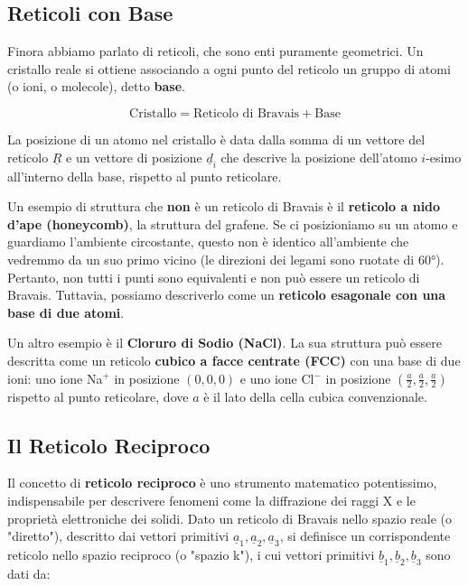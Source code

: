 \subsection{Reticoli con Base}

Finora abbiamo parlato di reticoli, che sono enti puramente geometrici. Un cristallo reale si ottiene associando a ogni punto del reticolo un gruppo di atomi (o ioni, o molecole), detto \textbf{base}.

\begin{equation}
    \text{Cristallo} = \text{Reticolo di Bravais} + \text{Base}
\end{equation}

La posizione di un atomo nel cristallo è data dalla somma di un vettore del reticolo $\underline{R}$ e un vettore di posizione $\underline{d}_i$ che descrive la posizione dell'atomo $i$-esimo all'interno della base, rispetto al punto reticolare.

Un esempio di struttura che \textbf{non} è un reticolo di Bravais è il \textbf{reticolo a nido d'ape (honeycomb)}, la struttura del grafene. Se ci posizioniamo su un atomo e guardiamo l'ambiente circostante, questo non è identico all'ambiente che vedremmo da un suo primo vicino (le direzioni dei legami sono ruotate di 60°). Pertanto, non tutti i punti sono equivalenti e non può essere un reticolo di Bravais. Tuttavia, possiamo descriverlo come un \textbf{reticolo esagonale con una base di due atomi}.

Un altro esempio è il \textbf{Cloruro di Sodio (NaCl)}. La sua struttura può essere descritta come un reticolo \textbf{cubico a facce centrate (FCC)} con una base di due ioni: uno ione Na$^+$ in posizione $(0,0,0)$ e uno ione Cl$^-$ in posizione $(\frac{a}{2}, \frac{a}{2}, \frac{a}{2})$ rispetto al punto reticolare, dove $a$ è il lato della cella cubica convenzionale.

\subsection{Il Reticolo Reciproco}

Il concetto di \textbf{reticolo reciproco} è uno strumento matematico potentissimo, indispensabile per descrivere fenomeni come la diffrazione dei raggi X e le proprietà elettroniche dei solidi. Dato un reticolo di Bravais nello spazio reale (o "diretto"), descritto dai vettori primitivi $\underline{a}_1, \underline{a}_2, \underline{a}_3$, si definisce un corrispondente reticolo nello spazio reciproco (o "spazio k"), i cui vettori primitivi $\underline{b}_1, \underline{b}_2, \underline{b}_3$ sono dati da:

